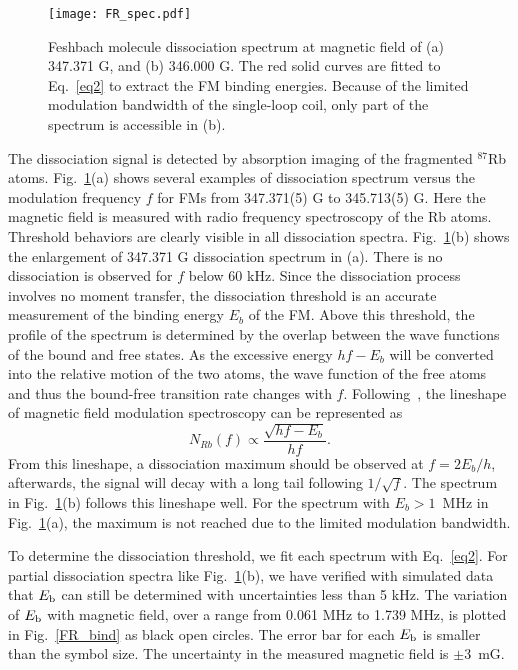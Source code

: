 \begin{figure}[htb]
\begin{center}
\texttt{[image: FR\_spec.pdf]}
\end{center}
\caption[Feshbach molecule dissociation spectrum]{Feshbach molecule dissociation spectrum at magnetic field of (a) 347.371 G, and (b) 346.000 G. The red solid curves are fitted to Eq.~\ref{eq2} to extract the FM binding energies. Because of the limited modulation bandwidth of the single-loop coil, only part of the spectrum is accessible in (b).}
\label{FR_spec}
\end{figure}

The dissociation signal is detected by absorption imaging of the fragmented $^{87}$Rb atoms. Fig.~\ref{FR_spec}(a) shows several examples of dissociation spectrum versus the modulation frequency $f$ for FMs from 347.371(5) G to 345.713(5) G. Here the magnetic field is measured with radio frequency spectroscopy of the Rb atoms. Threshold behaviors are clearly visible in all dissociation spectra. Fig.~\ref{FR_spec}(b) shows the enlargement of 347.371 G dissociation spectrum in (a). There is no dissociation is observed for $f$ below 60 kHz. Since the dissociation process involves no moment transfer, the dissociation threshold is an accurate measurement of the binding energy $E_b$ of the FM. Above this threshold, the profile of the spectrum is determined by the overlap between the wave functions of the bound and free states. As the excessive energy $hf-E_b$ will be converted into the relative motion of the two atoms, the wave function of the free atoms and thus the bound-free transition rate changes with $f$. Following~\cite{Mohapatra2015}, the lineshape of magnetic field modulation spectroscopy can be represented as
\begin{equation}
N_{Rb}(f) \propto \frac{\sqrt{hf-E_b}}{hf}.
\label{eq2}
\end{equation}
From this lineshape, a dissociation maximum should be observed at $f = 2E_b/h$, afterwards, the signal will decay with a long tail following $1/\sqrt{f}$. The spectrum in Fig.~\ref{FR_spec}(b) follows this lineshape well. For the spectrum with $E_b>1$~MHz in Fig.~\ref{FR_spec}(a), the maximum is not reached due to the limited modulation bandwidth. 

To determine the dissociation threshold, we fit each spectrum with Eq.~\ref{eq2}. For partial dissociation spectra like Fig.~\ref{FR_spec}(b), we have verified with simulated data that $E_{\rm b}$ can still be determined with uncertainties less than 5 kHz. The variation of $E_{\rm b}$ with magnetic field, over a range from 0.061 MHz to 1.739 MHz, is plotted in Fig.~\ref{FR_bind} as black open circles. The error bar for each $E_{\rm b}$ is smaller than the symbol size. The uncertainty in the measured magnetic field is $\pm3$~mG. 

